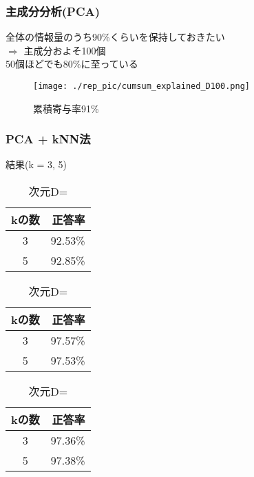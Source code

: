 \documentclass[dvipdfmx]{beamer}
\begin{document}
\begin{frame}
  \frametitle{主成分分析(PCA)}
  全体の情報量のうち90\%くらいを保持しておきたい \\
  $ \Rightarrow $ 主成分およそ100個 \\
  50個ほどでも80\%に至っている
  \begin{figure}
    \centering
       \texttt{[image: ./rep\_pic/cumsum\_explained\_D100.png]}
       \caption{累積寄与率91\%}
  \end{figure}

\end{frame}

\begin{frame}
  \frametitle{PCA + kNN法}
  結果(k = 3, 5)
  \begin{table}
    \centering
    \begin{minipage}{0.3\columnwidth}
      \caption{次元D= }
      \centering
      \begin{tabular}{c r } \toprule
      kの数 & 正答率  \\ \midrule
      3 & 92.53\% \\
      5 & 92.85\% \\ \bottomrule
      \end{tabular}
    \end{minipage}
    \begin{minipage}{0.3\columnwidth}
      \caption{次元D= }
      \centering
      \begin{tabular}{c r } \toprule
      kの数 & 正答率  \\ \midrule
      3 & 97.57\% \\
      5 & 97.53\% \\ \bottomrule
      \end{tabular}
    \end{minipage}
    \begin{minipage}{0.3\columnwidth}
      \caption{次元D= }
      \centering
      \begin{tabular}{c r } \toprule
      kの数 & 正答率  \\ \midrule
      3 & 97.36\% \\
      5 & 97.38\% \\ \bottomrule
      \end{tabular}
    \end{minipage}
  \end{table}

\end{frame}
\end{document}
